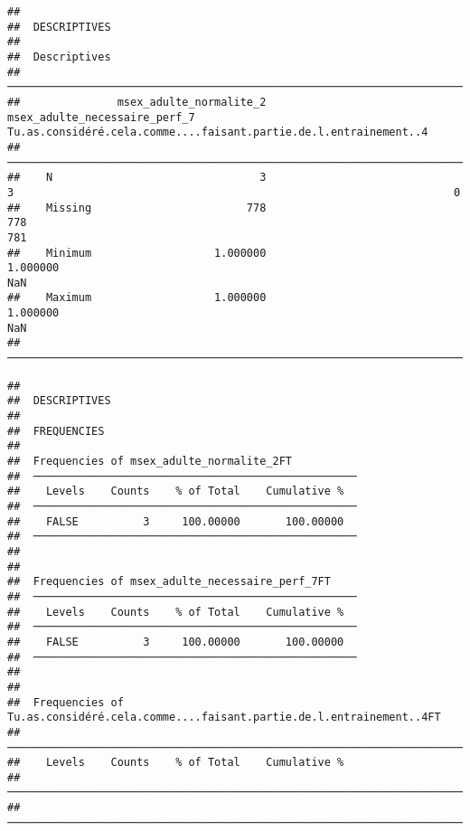 \documentclass[
]{article}
\begin{document}
\begin{verbatim}
## 
##  DESCRIPTIVES
## 
##  Descriptives                                                                                                                                 
##  ──────────────────────────────────────────────────────────────────────────────────────────────────────────────────────────────────────────── 
##               msex_adulte_normalite_2    msex_adulte_necessaire_perf_7    Tu.as.considéré.cela.comme....faisant.partie.de.l.entrainement..4   
##  ──────────────────────────────────────────────────────────────────────────────────────────────────────────────────────────────────────────── 
##    N                                3                                3                                                                    0   
##    Missing                        778                              778                                                                  781   
##    Minimum                   1.000000                         1.000000                                                                  NaN   
##    Maximum                   1.000000                         1.000000                                                                  NaN   
##  ────────────────────────────────────────────────────────────────────────────────────────────────────────────────────────────────────────────
\end{verbatim}

\begin{verbatim}
## 
##  DESCRIPTIVES
## 
##  FREQUENCIES
## 
##  Frequencies of msex_adulte_normalite_2FT           
##  ────────────────────────────────────────────────── 
##    Levels    Counts    % of Total    Cumulative %   
##  ────────────────────────────────────────────────── 
##    FALSE          3     100.00000       100.00000   
##  ────────────────────────────────────────────────── 
## 
## 
##  Frequencies of msex_adulte_necessaire_perf_7FT     
##  ────────────────────────────────────────────────── 
##    Levels    Counts    % of Total    Cumulative %   
##  ────────────────────────────────────────────────── 
##    FALSE          3     100.00000       100.00000   
##  ────────────────────────────────────────────────── 
## 
## 
##  Frequencies of Tu.as.considéré.cela.comme....faisant.partie.de.l.entrainement..4FT 
##  ────────────────────────────────────────────────────────────────────────────────── 
##    Levels    Counts    % of Total    Cumulative %   
##  ────────────────────────────────────────────────────────────────────────────────── 
##  ──────────────────────────────────────────────────────────────────────────────────
\end{verbatim}
\end{document}
